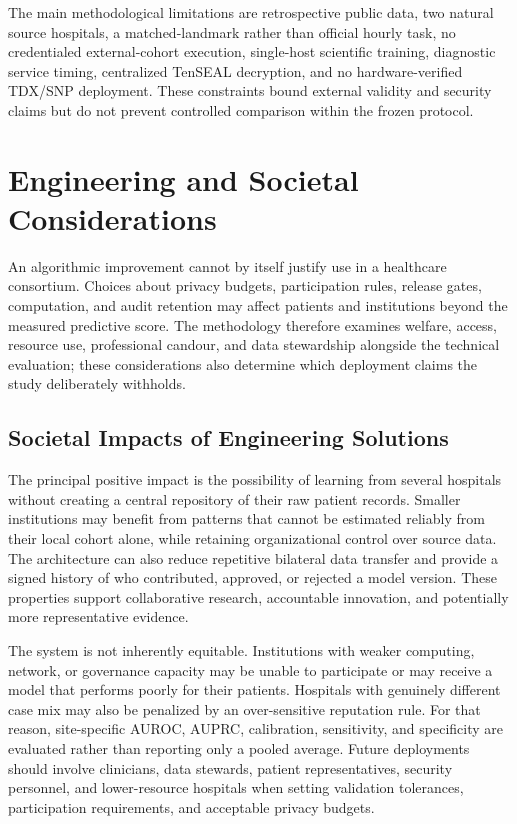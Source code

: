 The main methodological limitations are retrospective public data, two natural source hospitals, a matched-landmark rather than official hourly task, no credentialed external-cohort execution, single-host scientific training, diagnostic service timing, centralized TenSEAL decryption, and no hardware-verified TDX/SNP deployment. These constraints bound external validity and security claims but do not prevent controlled comparison within the frozen protocol.

\section{Engineering and Societal Considerations}
\label{sec:engineering-society}

An algorithmic improvement cannot by itself justify use in a healthcare consortium. Choices about privacy budgets, participation rules, release gates, computation, and audit retention may affect patients and institutions beyond the measured predictive score. The methodology therefore examines welfare, access, resource use, professional candour, and data stewardship alongside the technical evaluation; these considerations also determine which deployment claims the study deliberately withholds.

\subsection{Societal Impacts of Engineering Solutions}
\label{subsec:societal-impact}

The principal positive impact is the possibility of learning from several hospitals without creating a central repository of their raw patient records. Smaller institutions may benefit from patterns that cannot be estimated reliably from their local cohort alone, while retaining organizational control over source data. The architecture can also reduce repetitive bilateral data transfer and provide a signed history of who contributed, approved, or rejected a model version. These properties support collaborative research, accountable innovation, and potentially more representative evidence.

The system is not inherently equitable. Institutions with weaker computing, network, or governance capacity may be unable to participate or may receive a model that performs poorly for their patients. Hospitals with genuinely different case mix may also be penalized by an over-sensitive reputation rule. For that reason, site-specific AUROC, AUPRC, calibration, sensitivity, and specificity are evaluated rather than reporting only a pooled average. Future deployments should involve clinicians, data stewards, patient representatives, security personnel, and lower-resource hospitals when setting validation tolerances, participation requirements, and acceptable privacy budgets.

